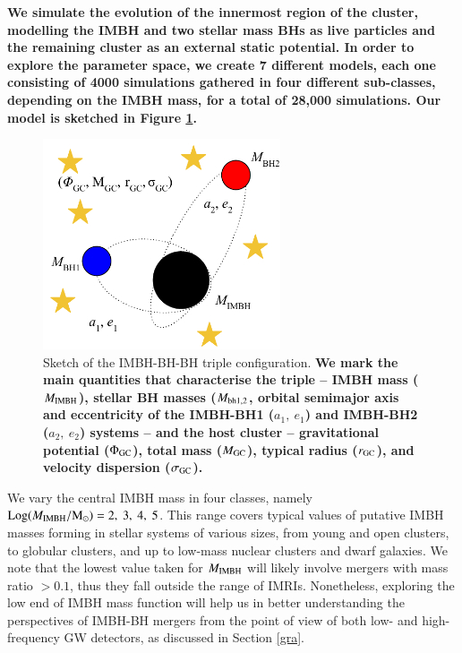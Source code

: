 \documentclass[article]{aa}
\newcommand{\Ms}{{\rm M}_\odot}
\newcommand{\gc}{{\rm GC}}
\newcommand{\ibh}{{\rm IMBH}}
\begin{document}
{\bf
We simulate the evolution of the innermost region of the cluster, modelling the IMBH and two stellar mass BHs as live particles and
the remaining cluster as an external static potential. In order to explore the parameter space, we create 7 different models, each one consisting of 4000 simulations gathered in four different sub-classes, depending on the IMBH mass, for a total of {\bf 28,000} simulations. Our model is sketched in Figure \ref{f1}. 

\begin{figure}
    \centering
    \includegraphics[width=7cm]{triple}
    \caption{Sketch of the IMBH-BH-BH triple configuration. {\bf We mark the main quantities that characterise the triple -- IMBH mass ($M_\ibh$), stellar BH masses ($M_{\rm bh 1,2}$, orbital semimajor axis and eccentricity of the IMBH-BH1 ($a_1,~e_1$) and IMBH-BH2 ($a_2,~e_2$) systems -- and the host cluster -- gravitational potential ($\Phi_\gc$), total mass ($M_\gc$), typical radius ($r_\gc$), and velocity dispersion ($\sigma_\gc$).} }    
\label{f1}
\end{figure}

We vary the central IMBH mass in four classes, namely ${\rm Log}(M_\ibh/\Ms) = 2,~3,~4,~5$. This range covers typical values of putative IMBH masses forming in stellar systems of various sizes, from young and open clusters, to globular clusters, and up to low-mass nuclear clusters and dwarf galaxies.
We note that the lowest value taken for $M_\ibh$ will likely involve mergers with mass ratio $> 0.1$, thus they fall outside the range of IMRIs. Nonetheless, exploring the low end of IMBH mass function will help us in better understanding the perspectives of IMBH-BH mergers from the point of view of both low- \citep[e.g.][]{Will04,seoane18} and high- \citep[e.g.][]{MandelEtAl2008,gair11,abbott17f} frequency GW detectors, as discussed in Section \ref{gra}.

}
\end{document}
